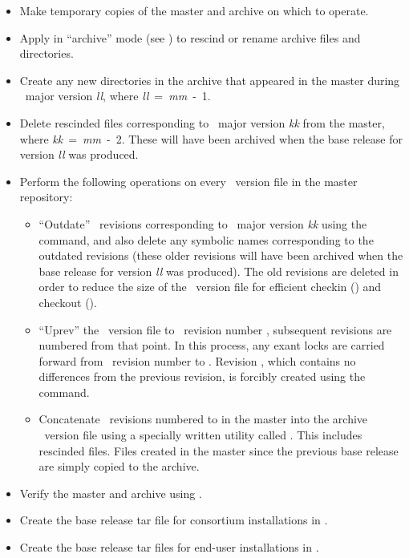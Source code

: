 \begin{itemize}
\item
   Make temporary copies of the master and archive on which to operate.

\item
   Apply  in ``archive'' mode (see ) to
   rescind or rename archive files and directories.

\item
   Create any new directories in the archive that appeared in the master
   during \aipspp\ major version \textit{ll}, where
   \textit{ll}~=~\textit{mm}~-~1.

\item
   Delete rescinded files corresponding to \aipspp\ major version \textit{kk}
   from the master, where \textit{kk}~=~\textit{mm}~-~2.  These will have
   been archived when the base release for version \textit{ll} was produced.

\item
   Perform the following operations on every \rcs\ version file in the master
   repository:

   \begin{itemize}
   \item
      ``Outdate'' \rcs\ revisions corresponding to \aipspp\ major version
      \textit{kk} using the  command, and also delete any symbolic
      names corresponding to the outdated revisions (these older revisions
      will have been archived when the base release for version \textit{ll}
      was produced).  The old revisions are deleted in order to reduce the
      size of the \rcs\ version file for efficient checkin () and
      checkout ().

   \item
      ``Uprev'' the \rcs\ version file to \rcs\ revision number
      , subsequent revisions are numbered from that point.
      In this process, any exant locks are carried forward from \rcs\ revision
      number  to .  Revision
      , which contains no differences from the previous
      revision, is forcibly created using the  command.

   \item
      Concatenate \rcs\ revisions numbered  to
       in the master into the archive \rcs\ version file
      using a specially written utility called .  This includes
      rescinded files.  Files created in the master since the previous base
      release are simply copied to the archive.
   \end{itemize}

\item
   Verify the master and archive using .

\item
   Create the base release tar file for consortium installations in
   .

\item
   Create the base release tar files for end-user installations in
   .
\end{itemize}

